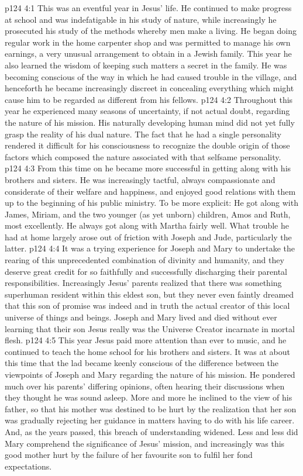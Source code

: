 \vs p124 4:1 This was an eventful year in Jesus’ life. He continued to make progress at school and was indefatigable in his study of nature, while increasingly he prosecuted his study of the methods whereby men make a living. He began doing regular work in the home carpenter shop and was permitted to manage his own earnings, a very unusual arrangement to obtain in a Jewish family. This year he also learned the wisdom of keeping such matters a secret in the family. He was becoming conscious of the way in which he had caused trouble in the village, and henceforth he became increasingly discreet in concealing everything which might cause him to be regarded as different from his fellows.
\vs p124 4:2 Throughout this year he experienced many seasons of uncertainty, if not actual doubt, regarding the nature of his mission. His naturally developing human mind did not yet fully grasp the reality of his dual nature. The fact that he had a single personality rendered it difficult for his consciousness to recognize the double origin of those factors which composed the nature associated with that selfsame personality.
\vs p124 4:3 From this time on he became more successful in getting along with his brothers and sisters. He was increasingly tactful, always compassionate and considerate of their welfare and happiness, and enjoyed good relations with them up to the beginning of his public ministry. To be more explicit: He got along with James, Miriam, and the two younger (as yet unborn) children, Amos and Ruth, most excellently. He always got along with Martha fairly well. What trouble he had at home largely arose out of friction with Joseph and Jude, particularly the latter.
\vs p124 4:4 \pc It was a trying experience for Joseph and Mary to undertake the rearing of this unprecedented combination of divinity and humanity, and they deserve great credit for so faithfully and successfully discharging their parental responsibilities. Increasingly Jesus’ parents realized that there was something superhuman resident within this eldest son, but they never even faintly dreamed that this son of promise was indeed and in truth the actual creator of this local universe of things and beings. Joseph and Mary lived and died without ever learning that their son Jesus really was the Universe Creator incarnate in mortal flesh.
\vs p124 4:5 This year Jesus paid more attention than ever to music, and he continued to teach the home school for his brothers and sisters. It was at about this time that the lad became keenly conscious of the difference between the viewpoints of Joseph and Mary regarding the nature of his mission. He pondered much over his parents’ differing opinions, often hearing their discussions when they thought he was sound asleep. More and more he inclined to the view of his father, so that his mother was destined to be hurt by the realization that her son was gradually rejecting her guidance in matters having to do with his life career. And, as the years passed, this breach of understanding widened. Less and less did Mary comprehend the significance of Jesus’ mission, and increasingly was this good mother hurt by the failure of her favourite son to fulfil her fond expectations.
